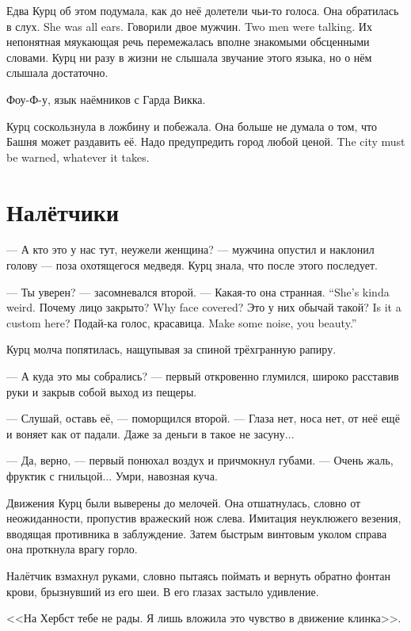 Едва Курц об этом подумала, как до неё долетели чьи-то голоса.
{Она обратилась в слух.}
{She was all ears.}
{Говорили двое мужчин.}
{Two men were talking.}
Их непонятная мяукающая речь перемежалась вполне знакомыми обсценными словами.
Курц ни разу в жизни не слышала звучание этого языка, но о нём слышала достаточно.

Фоу-Ф-у, язык наёмников с Гарда Викка.

Курц соскользнула в ложбину и побежала.
Она больше не думала о том, что Башня может раздавить её.
{Надо предупредить город любой ценой.}
{The city must be warned, whatever it takes.}

\section{Налётчики}

--- А кто это у нас тут, неужели женщина? --- мужчина опустил и наклонил голову --- поза охотящегося медведя.
Курц знала, что после этого последует.

--- Ты уверен? --- засомневался второй.
{--- Какая-то она странная.}
{``She's kinda weird.}
{Почему лицо закрыто?}
{Why face covered?}
{Это у них обычай такой?}
{Is it a custom here?}
{Подай-ка голос, красавица.}
{Make some noise, you beauty.''}

Курц молча попятилась, нащупывая за спиной трёхгранную рапиру.

--- А куда это мы собрались? --- первый откровенно глумился, широко расставив руки и закрыв собой выход из пещеры.

--- Слушай, оставь её, --- поморщился второй.
--- Глаза нет, носа нет, от неё ещё и воняет как от падали.
Даже за деньги в такое не засуну...

--- Да, верно, --- первый понюхал воздух и причмокнул губами.
--- Очень жаль, фруктик с гнильцой...
Умри, навозная куча.

Движения Курц были выверены до мелочей.
Она отшатнулась, словно от неожиданности, пропустив вражеский нож слева.
Имитация неуклюжего везения, вводящая противника в заблуждение.
Затем быстрым винтовым уколом справа она проткнула врагу горло.

Налётчик взмахнул руками, словно пытаясь поймать и вернуть обратно фонтан крови, брызнувший из его шеи.
В его глазах застыло удивление.

<<На Хербст тебе не рады.
Я лишь вложила это чувство в движение клинка>>.


